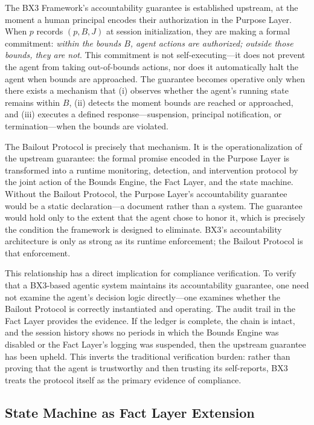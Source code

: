 The BX3 Framework's accountability guarantee is established upstream, at the moment a human principal encodes their authorization in the Purpose Layer. When $p$ records $(p, B, J)$ at session initialization, they are making a formal commitment: \emph{within the bounds $B$, agent actions are authorized; outside those bounds, they are not}. This commitment is not self-executing—it does not prevent the agent from taking out-of-bounds actions, nor does it automatically halt the agent when bounds are approached. The guarantee becomes operative only when there exists a mechanism that (i) observes whether the agent's running state remains within $B$, (ii) detects the moment bounds are reached or approached, and (iii) executes a defined response—suspension, principal notification, or termination—when the bounds are violated.

The Bailout Protocol is precisely that mechanism. It is the operationalization of the upstream guarantee: the formal promise encoded in the Purpose Layer is transformed into a runtime monitoring, detection, and intervention protocol by the joint action of the Bounds Engine, the Fact Layer, and the state machine. Without the Bailout Protocol, the Purpose Layer's accountability guarantee would be a static declaration—a document rather than a system. The guarantee would hold only to the extent that the agent chose to honor it, which is precisely the condition the framework is designed to eliminate. BX3's accountability architecture is only as strong as its runtime enforcement; the Bailout Protocol is that enforcement.

This relationship has a direct implication for compliance verification. To verify that a BX3-based agentic system maintains its accountability guarantee, one need not examine the agent's decision logic directly—one examines whether the Bailout Protocol is correctly instantiated and operating. The audit trail in the Fact Layer provides the evidence. If the ledger is complete, the chain is intact, and the session history shows no periods in which the Bounds Engine was disabled or the Fact Layer's logging was suspended, then the upstream guarantee has been upheld. This inverts the traditional verification burden: rather than proving that the agent is trustworthy and then trusting its self-reports, BX3 treats the protocol itself as the primary evidence of compliance.

\subsection{State Machine as Fact Layer Extension}

